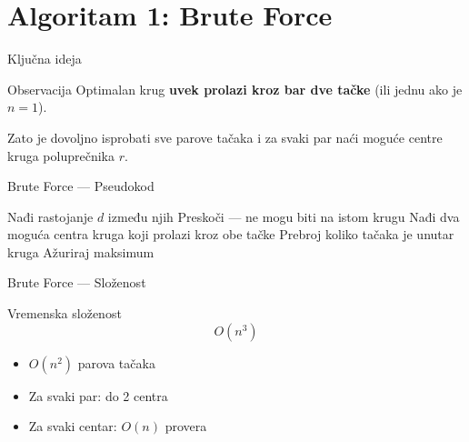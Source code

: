 \documentclass{beamer}
\begin{document}
\section{Algoritam 1: Brute Force}

\begin{frame}{Ključna ideja}
\begin{block}{Observacija}
Optimalan krug \textbf{uvek prolazi kroz bar dve tačke} (ili jednu ako je $n=1$).
\end{block}

\vspace{10pt}

Zato je dovoljno isprobati sve parove tačaka i za svaki par naći moguće centre kruga poluprečnika $r$.

\vspace{10pt}

\begin{center}
\end{center}
\end{frame}

\begin{frame}{Brute Force --- Pseudokod}
\begin{algorithmic}[1]
    \STATE Nađi rastojanje $d$ između njih
        \STATE Preskoči --- ne mogu biti na istom krugu
    \ENDIF
    \STATE Nađi dva moguća centra kruga koji prolazi kroz obe tačke
        \STATE Prebroj koliko tačaka je unutar kruga
        \STATE Ažuriraj maksimum
    \ENDFOR
\ENDFOR
\end{algorithmic}
\end{frame}

\begin{frame}{Brute Force --- Složenost}
\begin{block}{Vremenska složenost}
\[
O(n^3)
\]
\begin{itemize}
    \item $O(n^2)$ parova tačaka
    \item Za svaki par: do 2 centra
    \item Za svaki centar: $O(n)$ provera
\end{itemize}
\end{block}
\end{frame}
\end{document}
